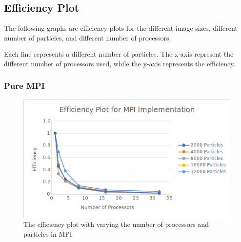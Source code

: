 \documentclass{article}
\begin{document}
\newpage
\subsection{Efficiency Plot}
The following graphs are efficiency plots for the different image sizes, different number of particles, and different number of processors.

Each line represents a different number of particles. The x-axis represent the different number of processors used, while the y-axis represents the efficiency.

\subsubsection{Pure MPI}
\begin{figure}[H]
	\begin{center}
		\hspace*{-0.5cm}                                                           
  		\includegraphics[scale=0.65]{Report_Assets/efficiencympi.png}
  	\end{center}
  	\caption{The efficiency plot with varying the number of processors and particles in MPI}
\end{figure}
\end{document}
